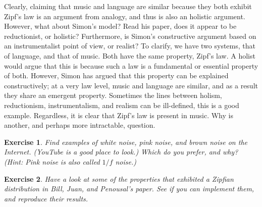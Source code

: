 \documentclass[10pt]{book}
\newtheorem{exercise}{Exercise}[chapter]
\begin{document}
Clearly, claiming that music and language are similar because they both exhibit Zipf's law is an argument from analogy, and thus is also an holistic argument. However, what about Simon's model? Read his paper, does it appear to be reductionist, or holistic? Furthermore, is Simon's constructive argument based on an instrumentalist point of view, or realist? To clarify, we have two systems, that of language, and that of music. Both have the same property, Zipf's law. A holist would argue that this is because such a law is a fundamental or essential property of both. However, Simon has argued that this property can be explained constructively; at a very law level, music and language are similar, and as a result they share an emergent property. Sometimes the lines between holism, reductionism, instrumentalism, and realism can be ill-defined, this is a good example. Regardless, it is clear that Zipf's law is present in music. Why is another, and perhaps more intractable, question.

\begin{exercise}
Find examples of white noise, pink noise, and brown noise on the Internet. (YouTube is a good place to look.) Which do you prefer, and why? (Hint: Pink noise is also called $1/f$ noise.)
\end{exercise}

\begin{exercise}
Have a look at some of the properties that exhibited a Zipfian distribution in Bill, Juan, and Penousal's paper. See if you can implement them, and reproduce their results.
\end{exercise}
\end{document}
